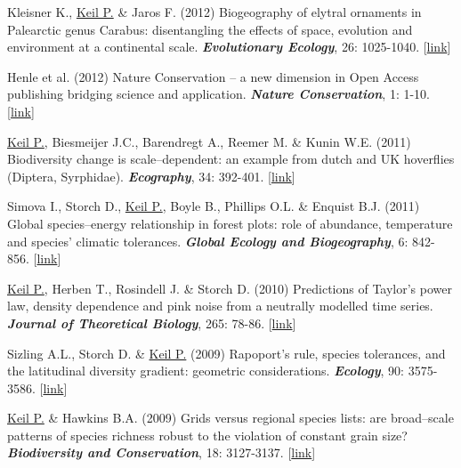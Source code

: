 \begin{etaremune}
\item Kleisner K., \underline{Keil P.} \& Jaros F. (2012) Biogeography of elytral ornaments in Palearctic genus Carabus: disentangling the effects of space, evolution and environment at a continental scale. \textit{\textbf{Evolutionary Ecology}}, 26: 1025-1040. [\href{http://link.springer.com/article/10.1007%2Fs10682-011-9537-z}{link}]

\item Henle et al. (2012) Nature Conservation -- a new dimension in Open Access publishing bridging science and application. \textit{\textbf{Nature Conservation}}, 1: 1-10. [\href{http://www.pensoft.net/journals/natureconservation/article/3081/abstract/}{link}]

\item \underline{Keil P.}, Biesmeijer J.C., Barendregt A., Reemer M. \& Kunin W.E. (2011) Biodiversity change is scale--dependent: an example from dutch and UK hoverflies (Diptera, Syrphidae). \textit{\textbf{Ecography}}, 34: 392-401. [\href{http://onlinelibrary.wiley.com/doi/10.1111/j.1600-0587.2010.06554.x/abstract}{link}]

\item Simova I., Storch D., \underline{Keil P.}, Boyle B., Phillips O.L. \& Enquist B.J. (2011) Global species--energy relationship in forest plots: role of abundance, temperature and species' climatic tolerances. \textit{\textbf{Global Ecology and Biogeography}}, 6: 842-856. [\href{http://onlinelibrary.wiley.com/doi/10.1111/j.1466-8238.2011.00650.x/abstract}{link}] 

\item \underline{Keil P.}, Herben T., Rosindell J. \& Storch D. (2010) Predictions of Taylor's power law, density dependence and pink noise from a neutrally modelled time series. \textit{\textbf{Journal of Theoretical Biology}}, 265: 78-86. [\href{http://www.sciencedirect.com/science/article/pii/S0022519310001979}{link}]

\item Sizling A.L., Storch D. \& \underline{Keil P.} (2009) Rapoport's rule, species tolerances, and the latitudinal diversity gradient: geometric considerations. \textit{\textbf{Ecology}}, 90: 3575-3586. [\href{http://www.esajournals.org/doi/abs/10.1890/08-1129.1?journalCode=ecol}{link}]

\item \underline{Keil P.} \& Hawkins B.A. (2009) Grids versus regional species lists: are broad--scale patterns of species richness robust to the violation of constant grain size? \textit{\textbf{Biodiversity and Conservation}}, 18: 3127-3137. [\href{http://link.springer.com/article/10.1007%2Fs10531-009-9631-5}{link}]


\end{etaremune}
